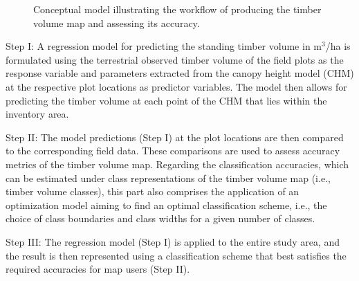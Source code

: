 \begin{figure}[H]
	\centering
	\caption{Conceptual model illustrating the workflow of producing the timber volume map and assessing its accuracy.}
	\label{fig:concept}
\end{figure}

Step I: A regression model for predicting the standing timber volume in m$^3$/ha is formulated using the terrestrial observed timber volume of the field plots as the response variable and parameters extracted from the canopy height model (CHM) at the respective plot locations as predictor variables. The model then allows for predicting the timber volume at each point of the CHM that lies within the inventory area.\par
Step II: The model predictions (Step I) at the plot locations are then compared to the corresponding field data. These comparisons are used to assess accuracy metrics of the timber volume map. Regarding the classification accuracies, which can be estimated under class representations of the timber volume map (i.e., timber volume classes), this part also comprises the application of an optimization model aiming to find an optimal classification scheme, i.e., the choice of class boundaries and class widths for a given number of classes.\par
Step III: The regression model (Step I) is applied to the entire study area, and the result is then represented using a classification scheme that best satisfies the required accuracies for map users (Step II).


